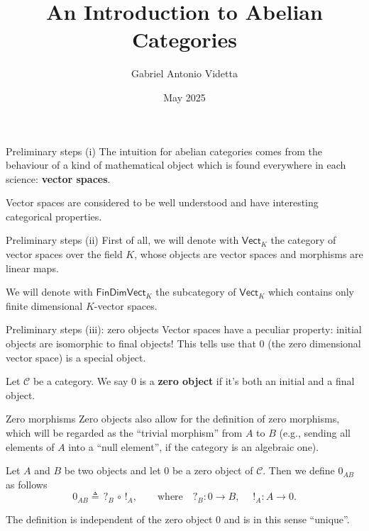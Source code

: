 \documentclass{beamer}
\title{An Introduction to Abelian Categories}
\author{Gabriel Antonio Videtta}
\date{May 2025}
\newcommand{\cat}[1]{\mathsf{#1}}
\begin{document}
\begin{frame}
    \titlepage
\end{frame}

\begin{frame}{Preliminary steps (i)}
    The intuition for abelian categories comes from the
    behaviour of a kind of
    mathematical object which is found
    everywhere in each science: \textbf{vector spaces}. \bigskip


    Vector spaces are considered to be well understood
    and have interesting categorical properties.
\end{frame}

\begin{frame}{Preliminary steps (ii)}
    First of all, we will denote with $\cat{Vect}_K$ the category
    of vector spaces over the field $K$, whose objects are vector spaces and
    morphisms are linear maps. \bigskip


    We will denote with $\cat{FinDimVect}_K$ the subcategory
    of $\cat{Vect}_K$ which contains only finite dimensional
    $K$-vector spaces.
\end{frame}

\begin{frame}{Preliminary steps (iii): zero objects}
    Vector spaces have a peculiar property: initial objects are
    isomorphic to final objects! This tells use that $0$ (the
    zero dimensional vector space) is a special object.
    
    \begin{definition}
        Let $\mathcal{C}$ be a category. We say $0$ is a
        \textbf{zero object} if it's both an initial and
        a final object.
    \end{definition}
\end{frame}

\begin{frame}{Zero morphisms}
    Zero objects also allow for the
    definition of zero morphisms, which will be regarded as the
    ``trivial morphism'' from $A$ to $B$ (e.g., sending all elements
    of $A$ into a ``null element'', if the category is an
    algebraic one). \medskip

    \begin{definition}
        Let $A$ and $B$ be two objects and let $0$ be a zero
        object of $\mathcal{C}$. Then we define $0_{AB}$ as
        follows
        \[
            0_{AB} \triangleq \, ?_{B} \, \circ \, !_{A}, \qquad \text{where} \quad ?_B : 0 \to B, \quad\; !_A : A \to 0.
        \]
    \end{definition}

    The definition is independent of the zero object $0$ and is
    in this sense ``unique''.
\end{frame}
\end{document}
